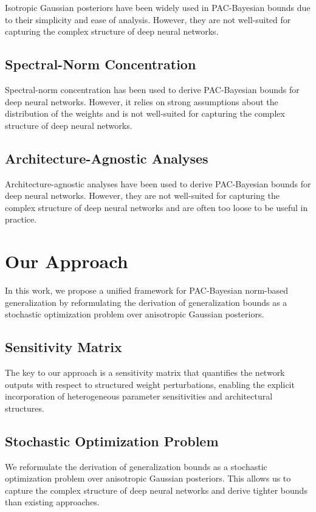 \documentclass{article}
\begin{document}
Isotropic Gaussian posteriors have been widely used in PAC-Bayesian bounds due to their simplicity and ease of analysis. However, they are not well-suited for capturing the complex structure of deep neural networks.

\subsection{Spectral-Norm Concentration}

Spectral-norm concentration has been used to derive PAC-Bayesian bounds for deep neural networks. However, it relies on strong assumptions about the distribution of the weights and is not well-suited for capturing the complex structure of deep neural networks.

\subsection{Architecture-Agnostic Analyses}

Architecture-agnostic analyses have been used to derive PAC-Bayesian bounds for deep neural networks. However, they are not well-suited for capturing the complex structure of deep neural networks and are often too loose to be useful in practice.

\section{Our Approach}

In this work, we propose a unified framework for PAC-Bayesian norm-based generalization by reformulating the derivation of generalization bounds as a stochastic optimization problem over anisotropic Gaussian posteriors.

\subsection{Sensitivity Matrix}

The key to our approach is a sensitivity matrix that quantifies the network outputs with respect to structured weight perturbations, enabling the explicit incorporation of heterogeneous parameter sensitivities and architectural structures.

\subsection{Stochastic Optimization Problem}

We reformulate the derivation of generalization bounds as a stochastic optimization problem over anisotropic Gaussian posteriors. This allows us to capture the complex structure of deep neural networks and derive tighter bounds than existing approaches.
\end{document}
